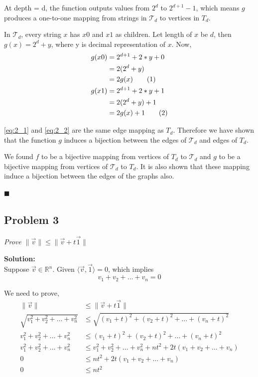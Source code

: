 \documentclass[12pt,a4paper]{article}
\newcommand\numberthis{\addtocounter{equation}{1}\tag{\theequation}}
\newcommand{\rightqed}{
\begin{flushright}
$\blacksquare$
\end{flushright}
}
\newcommand{\solution}{\noindent\textbf{Solution:}\\\indent}
\begin{document}
At depth = d, the function outputs values from $2^d$ to $2^{d+1}-1$, which means $g$ produces a one-to-one mapping from strings in $\mathcal{T}_d$ to vertices in $T_d$.

In $\mathcal{T}_d$, every string $x$ has $x0$ and $x1$ as children. Let length of $x$ be $d$, then $g(x) = 2^d + y$, where y is decimal representation of $x$. Now,
\begin{align*}
    g(x0) &= 2^{d+1} + 2*y + 0 \\
          &= 2(2^d + y) \\
          &= 2g(x) \numberthis \label{eq:2_1}\\
    g(x1) &= 2^{d+1} + 2*y + 1 \\
          &= 2(2^d + y) + 1 \\
          &= 2g(x) + 1 \numberthis \label{eq:2_2}
\end{align*}

\eqref{eq:2_1} and \eqref{eq:2_2} are the same edge mapping as $T_d$. Therefore we have shown that the function $g$ induces a bijection between the edges of $\mathcal{T}_d$ and edges of $T_d$.

We found $f$ to be a bijective mapping from vertices of $T_d$ to $\mathcal{T}_d$ and $g$ to be a bijective mapping from vertices of $\mathcal{T}_d$ to $T_d$. It is also shown that these mapping induce a bijection between the edges of the graphs also.
\rightqed


\newpage
\subsection*{Problem 3}
\textit{
    Prove $\|\vec{v}\| \leq \|\vec{v} + t\vec{1}\|$
}

\solution
Suppose $\vec{v} \in \mathbb{R}^n$. Given $\langle \vec{v}, \vec{1} \rangle = 0$, which implies
\begin{equation}
    v_1 + v_2 + \hdots + v_n = 0 \label{eq:3_1}
\end{equation}

We need to prove,
\begin{align}
    \|\vec{v}\| &\leq \|\vec{v} + t\vec{1}\| \\
    \sqrt{v_1^2 + v_2^2 + \hdots + v_n^2} &\leq \sqrt{(v_1+t)^2 + (v_2+t)^2 + \hdots + (v_n+t)^2} \label{eq:3_2} \\
    v_1^2 + v_2^2 + \hdots + v_n^2 &\leq (v_1+t)^2 + (v_2+t)^2 + \hdots + (v_n+t)^2 \label{eq:3_3} \\
    v_1^2 + v_2^2 + \hdots + v_n^2 &\leq v_1^2 + v_2^2 + \hdots + v_n^2 + nt^2 + 2t(v_1+v_2+ \hdots + v_n) \\
    0 &\leq nt^2 + 2t(v_1 + v_2 + \hdots + v_n) \label{eq:3_5} \\
    0 &\leq nt^2 \label{eq:3_6}
\end{align}
\end{document}
